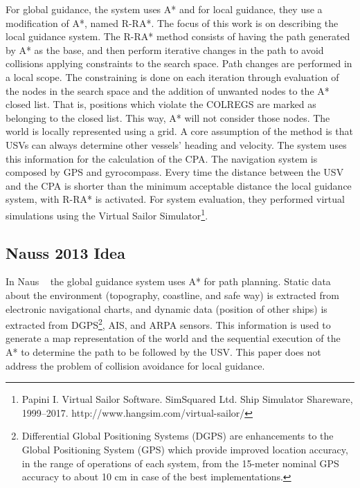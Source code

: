     For global guidance, the system uses A* and for local guidance, they use a modification of A*, named \ac{R-RA*}. The focus of this work is on describing the local guidance system. The \ac{R-RA*} method consists of having the path generated by A* as the base, and then perform iterative changes in the path to avoid collisions applying constraints to the search space. Path changes are performed in a local scope. The constraining is done on each iteration through evaluation of the nodes in the search space and the addition of unwanted nodes to the A* closed list. That is, positions which violate the \ac{COLREGS} are marked as belonging to the closed list. This way, A* will not consider those nodes. The world is locally represented using a grid. A core assumption of the method is that \ac{USV}s can always determine other vessels' heading and velocity. The system uses this information for the calculation of the \ac{CPA}. The navigation system is composed by GPS and gyrocompass. Every time the distance between the \ac{USV} and the \ac{CPA} is shorter than the minimum acceptable distance the local guidance system, with \ac{R-RA*} is activated. For system evaluation, they performed virtual simulations using the Virtual Sailor Simulator\footnote{Papini I. Virtual Sailor Software. SimSquared Ltd. Ship Simulator Shareware, 1999–2017. http://www.hangsim.com/virtual-sailor/}.
    
    \subsection{Nauss 2013 Idea}
    In Naus \etal~\cite{Naus2013Idea} the global guidance system uses A* for path planning. 
    Static data about the environment (topography, coastline, and safe way) is extracted from electronic navigational charts, and dynamic data (position of other ships) is extracted from \ac{DGPS}\footnote{Differential Global Positioning Systems (DGPS) are enhancements to the Global Positioning System (GPS) which provide improved location accuracy, in the range of operations of each system, from the 15-meter nominal GPS accuracy to about 10 cm in case of the best implementations.}, \ac{AIS}, and \ac{ARPA} sensors. This information is used to generate a map representation of the world and the sequential execution of the A* to determine the path to be followed by the \ac{USV}. This paper does not address the problem of collision avoidance for local guidance.
    
